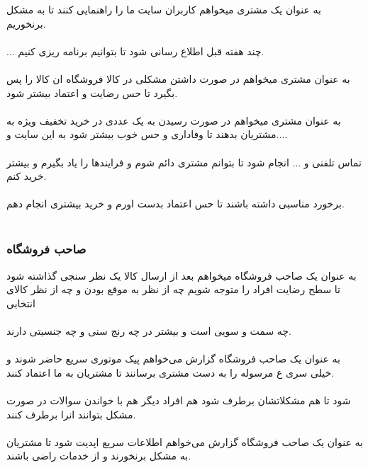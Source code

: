 \documentclass[12pt,onecolumn,a4paper]{article}
\begin{document}
به عنوان یک مشتری میخواهم کاربران سایت ما را راهنمایی کنند تا به مشکل برنخوریم.\\
\\

... چند هفته قبل اطلاع رسانی شود تا بتوانیم برنامه ریزی کنیم.\\
\\


به عنوان مشتری میخواهم در صورت داشتن مشکلی در کالا فروشگاه ان کالا را پس بگیرد تا حس رضایت و اعتماد بیشتر شود.\\
\\


به عنوان مشتری میخواهم در صورت رسیدن به یک عددی در خرید تخفیف ویژه به مشتریان بدهند تا وفاداری و حس خوب بیشتر شود به این سایت و....\\
\\
 
 تماس تلفنی و ... انجام شود تا بتوانم مشتری دائم شوم و فرایندها را یاد بگیرم و بیشتر خرید کنم.\\
\\

 برخورد مناسبی داشته باشند تا حس اعتماد بدست اورم و خرید بیشتری انجام دهم.\\
\\




\subsubsection{ صاحب فروشگاه  }

	  به عنوان یک صاحب فروشگاه میخواهم بعد از ارسال کالا یک نظر سنجی گذاشته شود تا سطح رضایت افراد را متوجه شویم چه از نظر به موقع بودن و چه از نظر کالای انتخابی\\
	  \\

 چه سمت و سویی است و بیشتر در چه رنج سنی و چه جنسیتی دارند.\\
\\


به عنوان یک صاحب فروشگاه گزارش می‌خواهم پیک موتوری سریع حاضر شوند و خیلی سری
ع مرسوله را به دست مشتری برسانند تا مشتریان به ما اعتماد کنند.\\
\\


 شود تا هم مشکلاتشان برطرف شود هم افراد دیگر هم با خواندن سوالات در صورت مشکل بتوانند انرا برطرف کنند.\\
\\


به عنوان یک صاحب فروشگاه گزارش می‌خواهم اطلاعات سریع اپدیت شود تا مشتریان به مشکل برنخورند و از خدمات راضی باشند.\\
\\
\end{document}
